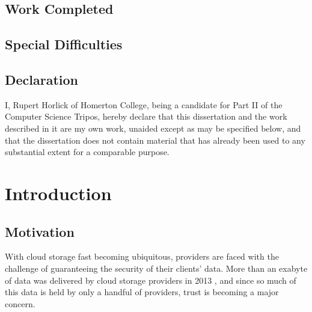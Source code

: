 \documentclass[12pt,a4paper,twoside,openright]{report}
\begin{document}

\section*{Work Completed}



\section*{Special Difficulties}



\newpage
\section*{Declaration}

I, Rupert Horlick of Homerton College, being a candidate for Part II of the Computer
Science Tripos, hereby declare
that this dissertation and the work described in it are my own work,
unaided except as may be specified below, and that the dissertation
does not contain material that has already been used to any substantial
extent for a comparable purpose.

\bigskip
{}

\medskip
{}

\tableofcontents

\listoffigures



\pagestyle{headings}

\chapter{Introduction}

\section{Motivation}

With cloud storage fast becoming ubiquitous, providers are faced with the challenge of guaranteeing the security of their clients' data. More than an exabyte of data was delivered by cloud storage providers in 2013 \cite{nasuni2013cloud}, and since so much of this data is held by only a handful of providers, trust is becoming a major concern.
\end{document}
